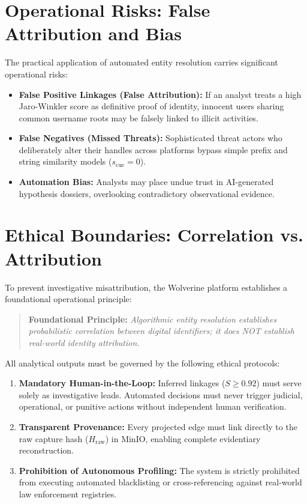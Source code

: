 \section{Operational Risks: False Attribution and Bias}
\label{sec:sec-operational-risks}
The practical application of automated entity resolution carries significant operational risks:
\begin{itemize}
    \item \textbf{False Positive Linkages (False Attribution):} If an analyst treats a high Jaro-Winkler score as definitive proof of identity, innocent users sharing common username roots may be falsely linked to illicit activities.
    \item \textbf{False Negatives (Missed Threats):} Sophisticated threat actors who deliberately alter their handles across platforms bypass simple prefix and string similarity models ($s_{\text{cue}} = 0$).
    \item \textbf{Automation Bias:} Analysts may place undue trust in AI-generated hypothesis dossiers, overlooking contradictory observational evidence.
\end{itemize}

\section{Ethical Boundaries: Correlation vs. Attribution}
\label{sec:sec-ethical-boundaries}
To prevent investigative misattribution, the Wolverine platform establishes a foundational operational principle:

\begin{quote}
\textbf{Foundational Principle:} \textit{Algorithmic entity resolution establishes probabilistic correlation between digital identifiers; it does NOT establish real-world identity attribution.}
\end{quote}

All analytical outputs must be governed by the following ethical protocols:
\begin{enumerate}
    \item \textbf{Mandatory Human-in-the-Loop:} Inferred linkages ($S \ge 0.92$) must serve solely as investigative leads. Automated decisions must never trigger judicial, operational, or punitive actions without independent human verification.
    \item \textbf{Transparent Provenance:} Every projected edge must link directly to the raw capture hash ($H_{\text{raw}}$) in MinIO, enabling complete evidentiary reconstruction.
    \item \textbf{Prohibition of Autonomous Profiling:} The system is strictly prohibited from executing automated blacklisting or cross-referencing against real-world law enforcement registries.
\end{enumerate}

